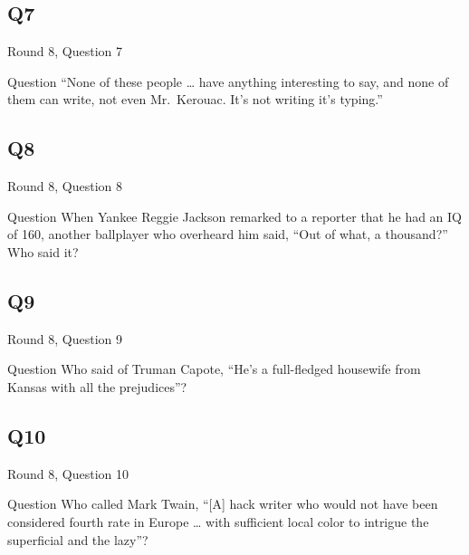 \documentclass[11pt]{beamer}
\begin{document}
\subsection*{Q7}
\begin{frame}[t]{Round 8, Question 7}
\begin{block}{Question}
``None of these people \ldots{} have anything interesting to say, and none of them can write, not even Mr.\ Kerouac. It's not writing it's typing.''
\end{block}
\end{frame}
\subsection*{Q8}
\begin{frame}[t]{Round 8, Question 8}
\begin{block}{Question}
When Yankee Reggie Jackson remarked to a reporter that he had an IQ of 160, another ballplayer who overheard him said, ``Out of what, a thousand?'' Who said it?
\end{block}
\end{frame}
\subsection*{Q9}
\begin{frame}[t]{Round 8, Question 9}
\begin{block}{Question}
Who said of Truman Capote, ``He's a full-fledged housewife from Kansas with all the prejudices''?
\end{block}
\end{frame}
\subsection*{Q10}
\begin{frame}[t]{Round 8, Question 10}
\begin{block}{Question}
Who called Mark Twain, ``[A] hack writer who would not have been considered fourth rate in Europe \ldots{} with sufficient local color to intrigue the superficial and the lazy''?
\end{block}
\end{frame}
\end{document}
